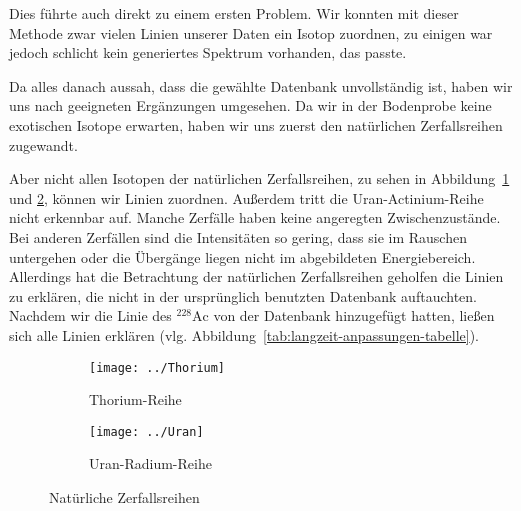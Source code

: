 \documentclass[11pt, ngerman, fleqn, DIV=15, headinclude, BCOR=2cm]{scrreprt}
\begin{document}

Dies führte auch direkt zu einem ersten Problem. Wir konnten mit dieser Methode
zwar vielen Linien unserer Daten ein Isotop zuordnen, zu einigen war jedoch
schlicht kein generiertes Spektrum vorhanden, das passte. 

Da alles danach aussah, dass die gewählte Datenbank unvollständig ist, haben
wir uns nach geeigneten Ergänzungen umgesehen. Da wir in der Bodenprobe keine
exotischen Isotope erwarten, haben wir uns zuerst den natürlichen
Zerfallsreihen zugewandt.

Aber nicht allen Isotopen der natürlichen Zerfallsreihen, zu sehen
in Abbildung~\ref{fig:thorium} und \ref{fig:uran}, können wir Linien 
zuordnen. 
Außerdem tritt die Uran-Actinium-Reihe nicht erkennbar auf.
Manche Zerfälle haben keine angeregten Zwischenzustände. Bei anderen
Zerfällen sind die
Intensitäten so gering, dass sie im Rauschen untergehen oder die Übergänge liegen
nicht im abgebildeten Energiebereich. Allerdings hat die Betrachtung der
natürlichen Zerfallsreihen geholfen die Linien zu erklären, die nicht in der
ursprünglich benutzten Datenbank auftauchten. Nachdem wir die Linie des
$^{228}\text{Ac}$ von \textcite{ac} der Datenbank hinzugefügt hatten, ließen sich alle Linien
erklären (vlg. Abbildung~\ref{tab:langzeit-anpassungen-tabelle}).


\begin{figure}
    \centering
    \begin{subfigure}[b]{0.48\linewidth}
    \centering
    \texttt{[image: ../Thorium]}
    \caption{%
        Thorium-Reihe
        \parencite{thorium}
    }
    \label{fig:thorium}
    \end{subfigure}
    \hfill
    \begin{subfigure}[b]{0.48\linewidth}
    \centering
    \texttt{[image: ../Uran]}
    \caption{%
        Uran-Radium-Reihe
        \parencite{uran}
    }
    \label{fig:uran}
    \end{subfigure}
    \caption{%
        Natürliche Zerfallsreihen
    }
    \label{fig:}
\end{figure}
\end{document}
